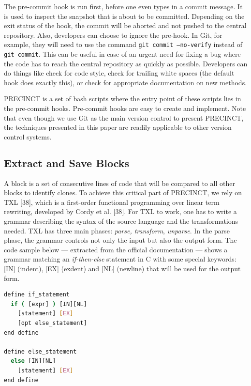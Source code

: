 \documentclass[12pt]{report}
\begin{document}
The pre-commit hook is run first, before one even types in a commit
message. It is used to inspect the snapshot that is about to be
committed. Depending on the exit status of the hook, the commit will be
aborted and not pushed to the central repository. Also, developers can
choose to ignore the pre-hook. In Git, for example, they will need to
use the command \lstinline!git commit –no-verify! instead of
\lstinline!git commit!. This can be useful in case of an urgent need for
fixing a bug where the code has to reach the central repository as
quickly as possible. Developers can do things like check for code style,
check for trailing white spaces (the default hook does exactly this), or
check for appropriate documentation on new methods.

PRECINCT is a set of bash scripts where the entry point of these scripts
lies in the pre-commit hooks. Pre-commit hooks are easy to create and
implement. Note that even though we use Git as the main version control
to present PRECINCT, the techniques presented in this paper are readily
applicable to other version control systems.

\subsection{Extract and Save Blocks}\label{extract-and-save-blocks}

A block is a set of consecutive lines of code that will be compared to
all other blocks to identify clones. To achieve this critical part of
PRECINCT, we rely on TXL {[}38{]}, which is a first-order functional
programming over linear term rewriting, developed by Cordy et al.
{[}38{]}. For TXL to work, one has to write a grammar describing the
syntax of the source language and the transformations needed. TXL has
three main phases: \emph{parse, transform}, \emph{unparse}. In the parse
phase, the grammar controls not only the input but also the output form.
The code sample below --- extracted from the official documentation ---
shows a grammar matching an \emph{if-then-else} statement in C with some
special keywords: {[}IN{]} (indent), {[}EX{]} (exdent) and {[}NL{]}
(newline) that will be used for the output form.

\begin{lstlisting}[language=bash]
define if_statement
  if ( [expr] ) [IN][NL]
    [statement] [EX]
    [opt else_statement]
end define

define else_statement
  else [IN][NL]
    [statement] [EX]
end define
\end{lstlisting}
\end{document}
